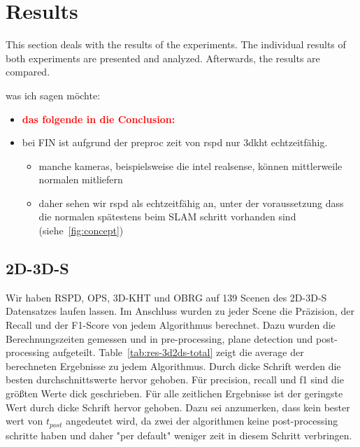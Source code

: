 \documentclass[main.tex]{subfiles}
\begin{document}
\section{Results}
This section deals with the results of the experiments. 
The individual results of both experiments are presented and analyzed. Afterwards, the results are compared.

was ich sagen möchte:
\begin{itemize}
    \item \textbf{\textcolor{red}{das folgende in die Conclusion:}}
    \item bei FIN ist aufgrund der preproc zeit von rspd nur 3dkht echtzeitfähig.
          \begin{itemize}
              \item manche kameras, beispielsweise die intel realsense, können mittlerweile normalen mitliefern
              \item daher sehen wir rspd als echtzeitfähig an, unter der voraussetzung dass die normalen spätestens beim SLAM schritt vorhanden
                    sind (siehe~\ref{fig:concept})
          \end{itemize}
\end{itemize}

\subsection{2D-3D-S}

Wir haben RSPD, OPS, 3D-KHT und OBRG auf 139 Scenen des 2D-3D-S Datensatzes laufen lassen. Im Anschluss wurden zu jeder Scene die Präzision,
der Recall und der F1-Score von jedem Algorithmus berechnet. Dazu wurden die Berechnungszeiten gemessen und in pre-processing, plane detection und
post-processing aufgeteilt. Table~\ref{tab:res-3d2ds-total} zeigt die average der berechneten Ergebnisse zu jedem Algorithmus. Durch dicke Schrift
werden die besten durchschnittswerte hervor gehoben. Für precision, recall und f1 sind die größten Werte dick geschrieben. Für alle zeitlichen
Ergebnisse ist der geringste Wert durch dicke Schrift hervor gehoben. Dazu sei anzumerken, dass kein bester wert von $t_{post}$ angedeutet wird, da zwei der algorithmen
keine post-processing schritte haben und daher "per default" weniger zeit in diesem Schritt verbringen.
\end{document}
